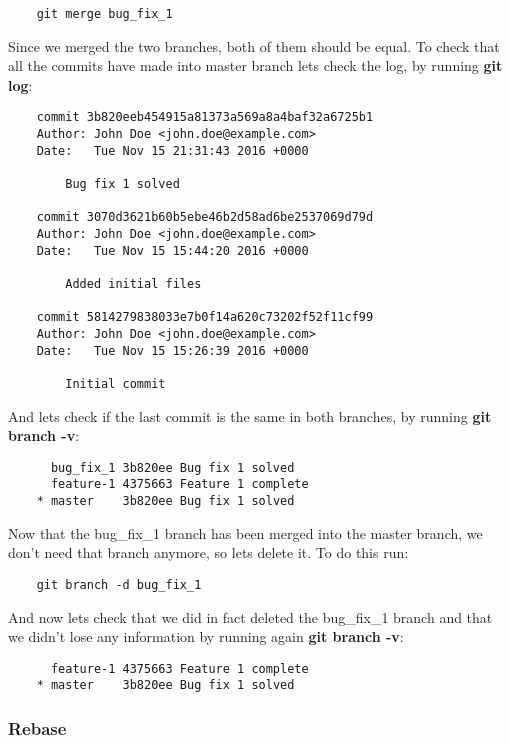 \documentclass{article}
\begin{document}
\begin{lstlisting}
	git merge bug_fix_1
\end{lstlisting}

Since we merged the two branches, both of them should be equal. To check that all the commits have made into master branch lets check the log, by running \textbf{git log}:

\begin{lstlisting}
	commit 3b820eeb454915a81373a569a8a4baf32a6725b1
	Author: John Doe <john.doe@example.com>
	Date:   Tue Nov 15 21:31:43 2016 +0000

    	Bug fix 1 solved

	commit 3070d3621b60b5ebe46b2d58ad6be2537069d79d
	Author: John Doe <john.doe@example.com>
	Date:   Tue Nov 15 15:44:20 2016 +0000

    	Added initial files

	commit 5814279838033e7b0f14a620c73202f52f11cf99
	Author: John Doe <john.doe@example.com>
	Date:   Tue Nov 15 15:26:39 2016 +0000

    	Initial commit
\end{lstlisting}

And lets check if the last commit is the same in both branches, by running \textbf{git branch -v}:

\begin{lstlisting}
	  bug_fix_1 3b820ee Bug fix 1 solved
	  feature-1 4375663 Feature 1 complete
	* master    3b820ee Bug fix 1 solved
\end{lstlisting}

Now that the bug\_fix\_1 branch has been merged into the master branch, we don't need that branch anymore, so lets delete it. To do this run:

\begin{lstlisting}
	git branch -d bug_fix_1
\end{lstlisting}

And now lets check that we did in fact deleted the bug\_fix\_1 branch and that we didn't lose any information by running again \textbf{git branch -v}:

\begin{lstlisting}
	  feature-1 4375663 Feature 1 complete
	* master    3b820ee Bug fix 1 solved
\end{lstlisting}

\subsubsection{Rebase}
\end{document}
